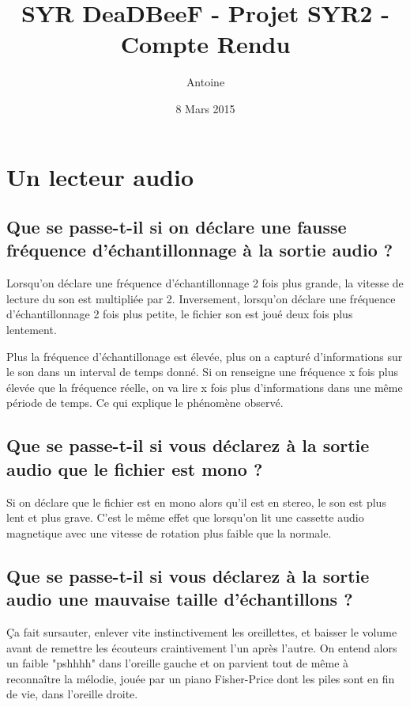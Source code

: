 \documentclass[a4paper,10pt,openany,oneside]{report}
\title{SYR DeaDBeeF - Projet SYR2 - Compte Rendu}
\author{Antoine \bsc{Pinsard}}
\date{8 Mars 2015}
\begin{document}
\maketitle

\section{Un lecteur audio}

\subsection{Que se passe-t-il si on déclare une fausse fréquence
            d'échantillonnage à la sortie audio ?}

Lorsqu'on déclare une fréquence d'échantillonnage 2 fois plus grande, la
vitesse de lecture du son est multipliée par 2. Inversement, lorsqu'on déclare
une fréquence d'échantillonnage 2 fois plus petite, le fichier son est joué
deux fois plus lentement.

Plus la fréquence d'échantillonage est élevée, plus on a capturé d'informations
sur le son dans un interval de temps donné. Si on renseigne une fréquence x
fois plus élevée que la fréquence réelle, on va lire x fois plus d'informations
dans une même période de temps. Ce qui explique le phénomène observé.

\subsection{Que se passe-t-il si vous déclarez à la sortie audio que le fichier
            est mono ?}

Si on déclare que le fichier est en mono alors qu'il est en stereo, le son est
plus lent et plus grave. C'est le même effet que lorsqu'on lit une cassette audio magnetique avec une vitesse de rotation plus faible que la normale.

\subsection{Que se passe-t-il si vous déclarez à la sortie audio une mauvaise
            taille d'échantillons ?}

Ça fait sursauter, enlever vite instinctivement les oreillettes, et baisser le
volume avant de remettre les écouteurs craintivement l'un après l'autre. On
entend alors un faible "pshhhh" dans l'oreille gauche et on parvient tout de
même à reconnaître la mélodie, jouée par un piano Fisher-Price dont les piles
sont en fin de vie, dans l'oreille droite.
\end{document}
